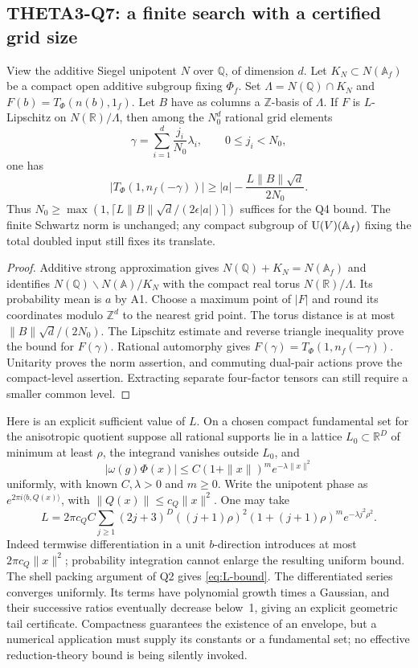 \documentclass[11pt]{article}
\newcommand{\Q}{\mathbb Q}\newcommand{\C}{\mathbb C}\newcommand{\Z}{\mathbb Z}\newcommand{\R}{\mathbb R}\newcommand{\A}{\mathbb A}\newcommand{\OO}{\mathcal O}
\theoremstyle{definition}\newtheorem{definition}[theorem]{Definition}\newtheorem{remark}[theorem]{Remark}
\begin{document}
\subsection{THETA3-Q7: a finite search with a certified grid size}\label{Q7}
View the additive Siegel unipotent $N$ over $\Q$, of dimension $d$. Let $K_N\subset N(\A_f)$ be a compact open additive subgroup fixing $\Phi_f$. Set
$\Lambda=N(\Q)\cap K_N$ and
$F(b)=T_\Phi(n(b),1_f)$. Let $B$ have as columns a $\Z$-basis of $\Lambda$. If $F$ is $L$-Lipschitz on $N(\R)/\Lambda$, then among the $N_0^d$ rational grid elements
\[
 \gamma=\sum_{i=1}^d\frac{j_i}{N_0}\lambda_i,
 \qquad 0\leq j_i<N_0,
\]
one has
\begin{equation}\label{eq:grid}
 |T_\Phi(1,n_f(-\gamma))|
 \geq |a|-\frac{L\|B\|\sqrt d}{2N_0}.
\end{equation}
Thus $N_0\geq\max(1,\lceil L\|B\|\sqrt d/(2\epsilon|a|)\rceil)$ suffices for the Q4 bound. The finite Schwartz norm is unchanged; any compact subgroup of $\U(V)(\A_f)$ fixing the total doubled input still fixes its translate.
\begin{proof}
Additive strong approximation gives $N(\Q)+K_N=N(\A_f)$ and identifies
$N(\Q)\backslash N(\A)/K_N$ with the compact real torus $N(\R)/\Lambda$. Its probability mean is $a$ by A1. Choose a maximum point of $|F|$ and round its coordinates modulo $\Z^d$ to the nearest grid point. The torus distance is at most $\|B\|\sqrt d/(2N_0)$. The Lipschitz estimate and reverse triangle inequality prove the bound for $F(\gamma)$. Rational automorphy gives $F(\gamma)=T_\Phi(1,n_f(-\gamma))$. Unitarity proves the norm assertion, and commuting dual-pair actions prove the compact-level assertion. Extracting separate four-factor tensors can still require a smaller common level.
\end{proof}
Here is an explicit sufficient value of $L$. On a chosen compact fundamental set for the anisotropic quotient suppose all rational supports lie in a lattice $L_0\subset\R^D$ of minimum at least $\rho$, the integrand vanishes outside $L_0$, and
\[
 |\omega(g)\Phi(x)|\leq C(1+\|x\|)^m e^{-\lambda\|x\|^2}
\]
uniformly, with known $C,\lambda>0$ and $m\geq0$. Write the unipotent phase as $e^{2\pi i\langle b,Q(x)\rangle}$, with
$\|Q(x)\|\leq c_Q\|x\|^2$. One may take
\begin{equation}\label{eq:L-bound}
 L=2\pi c_Q C\sum_{j\geq1}(2j+3)^D((j+1)\rho)^2
       (1+(j+1)\rho)^m e^{-\lambda j^2\rho^2}.
\end{equation}
Indeed termwise differentiation in a unit $b$-direction introduces at most $2\pi c_Q\|x\|^2$; probability integration cannot enlarge the resulting uniform bound. The shell packing argument of Q2 gives \eqref{eq:L-bound}. The differentiated series converges uniformly. Its terms have polynomial growth times a Gaussian, and their successive ratios eventually decrease below~1, giving an explicit geometric tail certificate. Compactness guarantees the existence of an envelope, but a numerical application must supply its constants or a fundamental set; no effective reduction-theory bound is being silently invoked.
\end{document}
